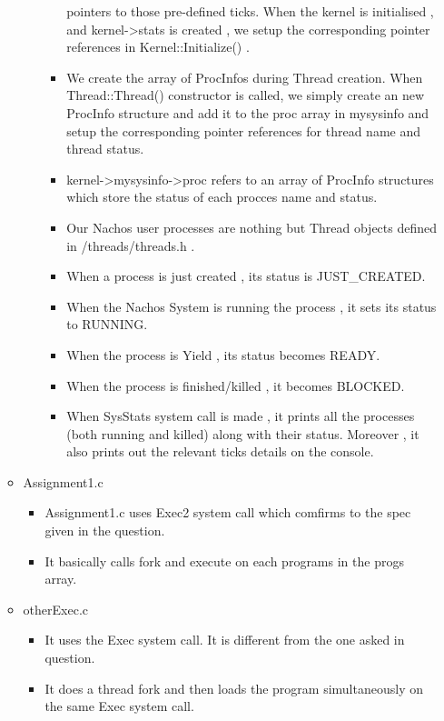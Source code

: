 \documentclass{article}
\begin{document}
\begin{itemize}
\begin{itemize}
\begin{itemize}
\begin{itemize}
        pointers to those pre-defined ticks. When the kernel is
        initialised , and kernel-\textgreater{}stats is created , we
        setup the corresponding pointer references in
        Kernel::Initialize() .
      \item
        We create the array of ProcInfos during Thread creation. When
        Thread::Thread() constructor is called, we simply create an new
        ProcInfo structure and add it to the proc array in mysysinfo and
        setup the corresponding pointer references for thread name and
        thread status.
      \item
        kernel-\textgreater{}mysysinfo-\textgreater{}proc refers to an
        array of ProcInfo structures which store the status of each
        procces name and status.
      \item
        Our Nachos user processes are nothing but Thread objects defined
        in /threads/threads.h .
      \item
        When a process is just created , its status is JUST\_CREATED.
      \item
        When the Nachos System is running the process , it sets its
        status to RUNNING.
      \item
        When the process is Yield , its status becomes READY.
      \item
        When the process is finished/killed , it becomes BLOCKED.
      \item
        When SysStats system call is made , it prints all the processes
        (both running and killed) along with their status. Moreover , it
        also prints out the relevant ticks details on the console.
      \end{itemize}
    \end{itemize}
  \item
    Assignment1.c
    \begin{itemize}
    \item
      Assignment1.c uses Exec2 system call which comfirms to the spec
      given in the question.
    \item
      It basically calls fork and execute on each programs in the progs
      array.
    \end{itemize}
  \item
    otherExec.c
    \begin{itemize}
    \item
      It uses the Exec system call. It is different from the one asked
      in question.
    \item
      It does a thread fork and then loads the program simultaneously on
      the same Exec system call.
    \end{itemize}
  \end{itemize}
\end{itemize}
\end{document}
